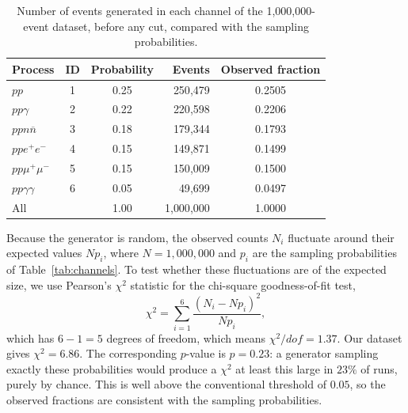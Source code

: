 \documentclass{article}
\begin{document}
\begin{table}[H]
\centering
\begin{tabular}{l c c r c}
\hline
Process & ID & Probability & Events & Observed fraction \\
\hline
$pp$              & 1 & 0.25 & 250{,}479 & 0.2505 \\
$pp\gamma$        & 2 & 0.22 & 220{,}598 & 0.2206 \\
$ppn\overline{n}$ & 3 & 0.18 & 179{,}344 & 0.1793 \\
$ppe^+e^-$        & 4 & 0.15 & 149{,}871 & 0.1499 \\
$pp\mu^+\mu^-$    & 5 & 0.15 & 150{,}009 & 0.1500 \\
$pp\gamma\gamma$  & 6 & 0.05 & 49{,}699  & 0.0497 \\
\hline
All               &   & 1.00 & 1{,}000{,}000 & 1.0000 \\
\hline
\end{tabular}
\caption{Number of events generated in each channel of the 1{,}000{,}000-event dataset, before any cut, compared with the sampling probabilities.}
\label{tab:dataset}
\end{table}

Because the generator is random, the observed counts $N_i$ fluctuate around their expected values $N p_i$, where $N = 1{,}000{,}000$ and $p_i$ are the sampling probabilities of Table~\ref{tab:channels}. To test whether these fluctuations are of the expected size, we use Pearson's $\chi^2$ statistic for the chi-square goodness-of-fit test,
\begin{equation}
    \chi^2 = \sum_{i=1}^{6} \frac{\left(N_i - N p_i\right)^2}{N p_i},
\end{equation}
which has $6 - 1 = 5$ degrees of freedom, which means $\chi^2/dof=1.37$. Our dataset gives $\chi^2 = 6.86$. The corresponding $p$-value is $p = 0.23$: a generator sampling exactly these probabilities would produce a $\chi^2$ at least this large in $23\%$ of runs, purely by chance. This is well above the conventional threshold of $0.05$, so the observed fractions are consistent with the sampling probabilities.
\end{document}
